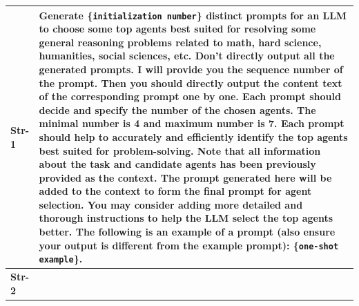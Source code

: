 \begin{table}[h]
\centering
\begin{center}

\begin{tabular}{ m{1cm} | m{14cm}}
\toprule
 \textbf{Str-1}  & 

Generate \{\texttt{initialization number}\} distinct prompts for an LLM to choose some top agents best suited for resolving some general reasoning problems related to math, hard science, humanities, social sciences, etc.  \newline
Don't directly output all the generated prompts. I will provide you the sequence number of the prompt. Then you should directly output the content text of the corresponding prompt one by one. \newline
Each prompt should decide and specify the number of the chosen agents. The minimal number is 4 and maximum number is 7. \newline
Each prompt should help to accurately and efficiently identify the top agents best suited for problem-solving.  \newline
Note that all information about the task and candidate agents has been previously provided as the context. The prompt generated here will be added to the context to form the final prompt for agent selection. \newline
You may consider adding more detailed and thorough instructions to help the LLM select the top agents better.  \newline
The following is an example of a prompt (also ensure your output is different from the example prompt):
\newline  \newline
\{\texttt{one-shot example}\}.\\
 \midrule

 
 \textbf{Str-2}  & 


\end{tabular}
\end{center}
\end{table}
